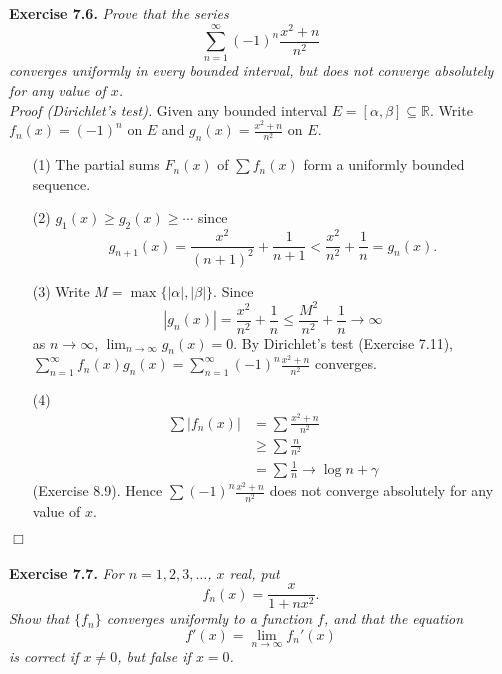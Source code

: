\documentclass{article}
\begin{document}



\textbf{Exercise 7.6.}
\emph{Prove that the series
\[
  \sum_{n=1}^{\infty} (-1)^n \frac{x^2+n}{n^2}
\]
converges uniformly in every bounded interval,
but does not converge absolutely for any value of $x$.} \\

\emph{Proof (Dirichlet's test).}
Given any bounded interval $E = [\alpha,\beta] \subseteq \mathbb{R}$.
Write $f_n(x) = (-1)^n$ on $E$ and $g_n(x) = \frac{x^2+n}{n^2}$ on $E$.
\begin{enumerate}
  \item[(1)]
  The partial sums $F_n(x)$ of $\sum f_n(x)$ form a uniformly bounded sequence.

  \item[(2)]
  $g_1(x) \geq g_2(x) \geq \cdots$ since
  \[
    g_{n+1}(x)
    = \frac{x^2}{(n+1)^2} + \frac{1}{n+1}
    < \frac{x^2}{n^2} + \frac{1}{n}
    = g_n(x).
  \]

  \item[(3)]
  Write $M = \max\{|\alpha|,|\beta|\}$.
  Since
  \[
    |g_n(x)|
    = \frac{x^2}{n^2} + \frac{1}{n}
    \leq \frac{M^2}{n^2} + \frac{1}{n} \to \infty
  \]
  as $n \to \infty$,
  $\lim_{n \to \infty} g_n(x) = 0$.
  By Dirichlet's test (Exercise 7.11),
  $\sum_{n=1}^{\infty} f_n(x) g_n(x) = \sum_{n=1}^{\infty} (-1)^n \frac{x^2+n}{n^2}$
  converges.

  \item[(4)]
  \begin{align*}
    \sum |f_n(x)|
    &= \sum \frac{x^2+n}{n^2} \\
    &\geq \sum \frac{n}{n^2} \\
    &= \sum \frac{1}{n} \to \log n + \gamma
  \end{align*}
  (Exercise 8.9).
  Hence $\sum (-1)^n \frac{x^2+n}{n^2}$ does not converge absolutely for any value of $x$.
\end{enumerate}
$\Box$ \\\\






\textbf{Exercise 7.7.}
\emph{For $n=1,2,3,\ldots$, $x$ real, put
\[
  f_n(x) = \frac{x}{1+nx^2}.
\]
Show that $\{f_n\}$ converges uniformly to a function $f$,
and that the equation
\[
  f'(x) = \lim_{n \to \infty} f_n'(x)
\]
is correct if $x \neq 0$, but false if $x = 0$.} \\
\end{document}
